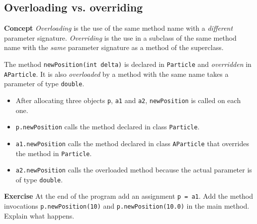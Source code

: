 \subsection{Overloading vs. overriding}\label{inher.09}

\textbf{Concept} \emph{Overloading} is the use of the same method name with a 
\emph{different} parameter signature. \emph{Overriding} is the use in a subclass 
of the same method name with the \emph{same} parameter signature as a method 
of the superclass.


The method \texttt{newPosition(int delta)} is declared in \texttt{Particle} and
\emph{overridden} in \texttt{AParticle}. It is also \emph{overloaded} by a method
with the same name takes a parameter of type \texttt{double}.
\begin{itemize}
\item After allocating three objects \texttt{p}, \texttt{a1} and \texttt{a2}, \texttt{newPosition} is called on  each one. 
\item \texttt{p.newPosition} calls the method declared in class 
\texttt{Particle}.
\item \texttt{a1.newPosition} calls the method declared 
in class \texttt{AParticle} that overrides the method in 
\texttt{Particle}. 
\item \texttt{a2.newPosition} calls the overloaded method 
because the actual parameter is of type \texttt{double}.
\end{itemize}

\textbf{Exercise} At the end of the program add an assignment \texttt{p = 
a1}. Add the method invocations \texttt{p.newPosition(10)} and 
\texttt{p.newPosition(10.0)} in the main method. Explain what happens.
